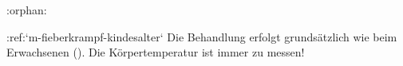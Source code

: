 :orphan:

:ref:`m-fieberkrampf-kindesalter`
Die Behandlung erfolgt grundsätzlich wie beim Erwachsenen ().
    Die Körpertemperatur ist immer zu messen! 